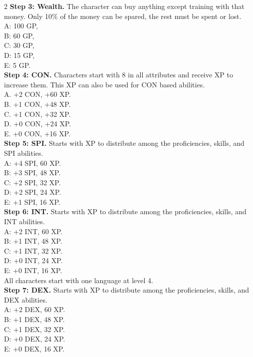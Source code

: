 \begin{multicols}{2}
\textbf{Step 3: Wealth.} The character can buy anything except training with that money. Only 10\% of the money can be spared, the rest must be spent or lost. \\
A: 100 GP, \\
B: 60 GP, \\
C: 30 GP, \\
D: 15 GP, \\
E: 5 GP.\\

\textbf{Step 4: CON.} Characters start with 8 in all attributes and receive XP to increase them. This XP can also be used for CON based abilities. \\
A. +2 CON, +60 XP. \\
B. +1 CON, +48 XP. \\
C. +1 CON, +32 XP. \\
D. +0 CON, +24 XP. \\
E. +0 CON, +16 XP. \\

\textbf{Step 5: SPI.} Starts with XP to distribute among the proficiencies, skills, and SPI abilities. \\
A: +4 SPI, 60 XP. \\
B: +3 SPI, 48 XP. \\
C: +2 SPI, 32 XP. \\
D: +2 SPI, 24 XP. \\
E: +1 SPI, 16 XP. \\

\textbf{Step 6: INT.} Starts with XP to distribute among the proficiencies, skills, and INT abilities. \\
A: +2 INT, 60 XP. \\
B: +1 INT, 48 XP. \\
C: +1 INT, 32 XP. \\
D: +0 INT, 24 XP. \\
E: +0 INT, 16 XP. \\
All characters start with one language at level 4.\\

\textbf{Step 7: DEX.} Starts with XP to distribute among the proficiencies, skills, and DEX abilities. \\
A: +2 DEX, 60 XP. \\
B: +1 DEX, 48 XP. \\
C: +1 DEX, 32 XP. \\
D: +0 DEX, 24 XP. \\
E: +0 DEX, 16 XP. \\

\end{multicols}
